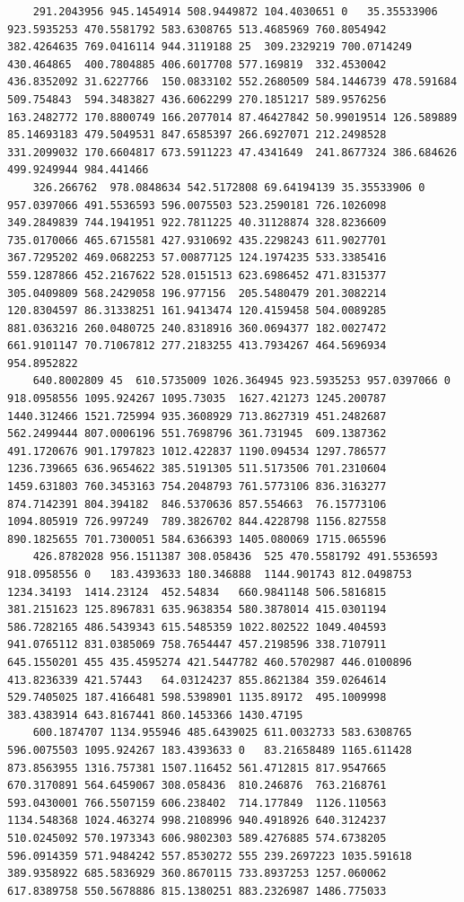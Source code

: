 \documentclass[UTF8]{ctexart}
\begin{document}
\begin{lstlisting}
	291.2043956	945.1454914	508.9449872	104.4030651	0	35.35533906	923.5935253	470.5581792	583.6308765	513.4685969	760.8054942	382.4264635	769.0416114	944.3119188	25	309.2329219	700.0714249	430.464865	400.7804885	406.6017708	577.169819	332.4530042	436.8352092	31.6227766	150.0833102	552.2680509	584.1446739	478.591684	509.754843	594.3483827	436.6062299	270.1851217	589.9576256	163.2482772	170.8800749	166.2077014	87.46427842	50.99019514	126.589889	85.14693183	479.5049531	847.6585397	266.6927071	212.2498528	331.2099032	170.6604817	673.5911223	47.4341649	241.8677324	386.684626	499.9249944	984.441466
	326.266762	978.0848634	542.5172808	69.64194139	35.35533906	0	957.0397066	491.5536593	596.0075503	523.2590181	726.1026098	349.2849839	744.1941951	922.7811225	40.31128874	328.8236609	735.0170066	465.6715581	427.9310692	435.2298243	611.9027701	367.7295202	469.0682253	57.00877125	124.1974235	533.3385416	559.1287866	452.2167622	528.0151513	623.6986452	471.8315377	305.0409809	568.2429058	196.977156	205.5480479	201.3082214	120.8304597	86.31338251	161.9413474	120.4159458	504.0089285	881.0363216	260.0480725	240.8318916	360.0694377	182.0027472	661.9101147	70.71067812	277.2183255	413.7934267	464.5696934	954.8952822
	640.8002809	45	610.5735009	1026.364945	923.5935253	957.0397066	0	918.0958556	1095.924267	1095.73035	1627.421273	1245.200787	1440.312466	1521.725994	935.3608929	713.8627319	451.2482687	562.2499444	807.0006196	551.7698796	361.731945	609.1387362	491.1720676	901.1797823	1012.422837	1190.094534	1297.786577	1236.739665	636.9654622	385.5191305	511.5173506	701.2310604	1459.631803	760.3453163	754.2048793	761.5773106	836.3163277	874.7142391	804.394182	846.5370636	857.554663	76.15773106	1094.805919	726.997249	789.3826702	844.4228798	1156.827558	890.1825655	701.7300051	584.6366393	1405.080069	1715.065596
	426.8782028	956.1511387	308.058436	525	470.5581792	491.5536593	918.0958556	0	183.4393633	180.346888	1144.901743	812.0498753	1234.34193	1414.23124	452.54834	660.9841148	506.5816815	381.2151623	125.8967831	635.9638354	580.3878014	415.0301194	586.7282165	486.5439343	615.5485359	1022.802522	1049.404593	941.0765112	831.0385069	758.7654447	457.2198596	338.7107911	645.1550201	455	435.4595274	421.5447782	460.5702987	446.0100896	413.8236339	421.57443	64.03124237	855.8621384	359.0264614	529.7405025	187.4166481	598.5398901	1135.89172	495.1009998	383.4383914	643.8167441	860.1453366	1430.47195
	600.1874707	1134.955946	485.6439025	611.0032733	583.6308765	596.0075503	1095.924267	183.4393633	0	83.21658489	1165.611428	873.8563955	1316.757381	1507.116452	561.4712815	817.9547665	670.3170891	564.6459067	308.058436	810.246876	763.2168761	593.0430001	766.5507159	606.238402	714.177849	1126.110563	1134.548368	1024.463274	998.2108996	940.4918926	640.3124237	510.0245092	570.1973343	606.9802303	589.4276885	574.6738205	596.0914359	571.9484242	557.8530272	555	239.2697223	1035.591618	389.9358922	685.5836929	360.8670115	733.8937253	1257.060062	617.8389758	550.5678886	815.1380251	883.2326987	1486.775033

\end{lstlisting}
\end{document}
